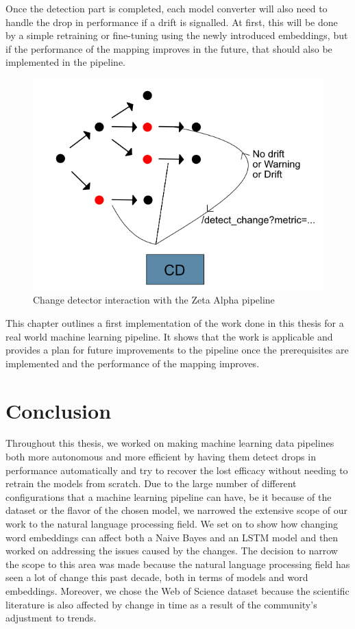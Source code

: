 \documentclass[12pt]{extreport}
\begin{document}
Once the detection part is completed, each model converter will also need to handle the drop in performance if a drift is signalled. At first, this will be done by a simple retraining or fine-tuning using the newly introduced embeddings, but if the performance of the mapping improves in the future, that should also be implemented in the pipeline.

\begin{figure}[H]
\centering
\includegraphics[width=0.9\linewidth]{assets/prototype/prototype.png}
\caption{Change detector interaction with the Zeta Alpha pipeline}
\label{fig:prototype}
\end{figure}

This chapter outlines a first implementation of the work done in this thesis for a real world machine learning pipeline. It shows that the work is applicable and provides a plan for future improvements to the pipeline once the prerequisites are implemented and the performance of the mapping improves.

\chapter{Conclusion} \label{sec:conclusion}

Throughout this thesis, we worked on making machine learning data pipelines both more autonomous and more efficient by having them detect drops in performance automatically and try to recover the lost efficacy without needing to retrain the models from scratch. Due to the large number of different configurations that a machine learning pipeline can have, be it because of the dataset or the flavor of the chosen model, we narrowed the extensive scope of our work to the natural language processing field. We set on to show how changing word embeddings can affect both a Naive Bayes and an LSTM model and then worked on addressing the issues caused by the changes. The decision to narrow the scope to this area was made because the natural language processing field has seen a lot of change this past decade, both in terms of models and word embeddings. Moreover, we chose the Web of Science dataset because the scientific literature is also affected by change in time as a result of the community's adjustment to trends.
\end{document}
